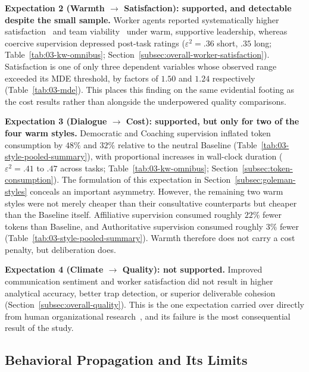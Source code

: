 \textbf{Expectation 2 (Warmth $\rightarrow$ Satisfaction): supported, and detectable despite the small sample.}
Worker agents reported systematically higher satisfaction~\cite{wageman2005teamdiagnosticsurvey} and team viability~\cite{auberousseau2005teamgoalcommitment} under warm, supportive leadership, whereas coercive supervision depressed post-task ratings ($\varepsilon^2 = .36$ short, $.35$ long; Table~\ref{tab:03-kw-omnibus}; Section~\ref{subsec:overall-worker-satisfaction}).
Satisfaction is one of only three dependent variables whose observed range exceeded its \ac{MDE} threshold, by factors of $1.50$ and $1.24$ respectively (Table~\ref{tab:03-mde}). 
This places this finding on the same evidential footing as the cost results rather than alongside the underpowered quality comparisons.

\textbf{Expectation 3 (Dialogue $\rightarrow$ Cost): supported, but only for two of the four warm styles.}
Democratic and Coaching supervision inflated token consumption by $48\%$ and $32\%$ relative to the neutral Baseline (Table~\ref{tab:03-style-pooled-summary}), with proportional increases in wall-clock duration ($\varepsilon^2 = .41$ to $.47$ across tasks; Table~\ref{tab:03-kw-omnibus}; Section~\ref{subsec:token-consumption}).
The formulation of this expectation in Section~\ref{subsec:goleman-styles} conceals an important asymmetry. 
However, the remaining two warm styles were not merely cheaper than their consultative counterparts but cheaper than the Baseline itself.
Affiliative supervision consumed roughly $22\%$ fewer tokens than Baseline, and Authoritative supervision consumed roughly $3\%$ fewer (Table~\ref{tab:03-style-pooled-summary}).
Warmth therefore does not carry a cost penalty, but deliberation does.

\textbf{Expectation 4 (Climate $\rightarrow$ Quality): not supported.}
Improved communication sentiment and worker satisfaction did not result in higher analytical accuracy, better trap detection, or superior deliverable cohesion (Section~\ref{subsec:overall-quality}).
This is the one expectation carried over directly from human organizational research~\cite{goleman2000leadership, barrick1998personalityteamwork, mathieu2017teamwork}, and its failure is the most consequential result of the study.

\subsection{Behavioral Propagation and Its Limits}
\label{subsec:behavioral-propagation-boundaries}


